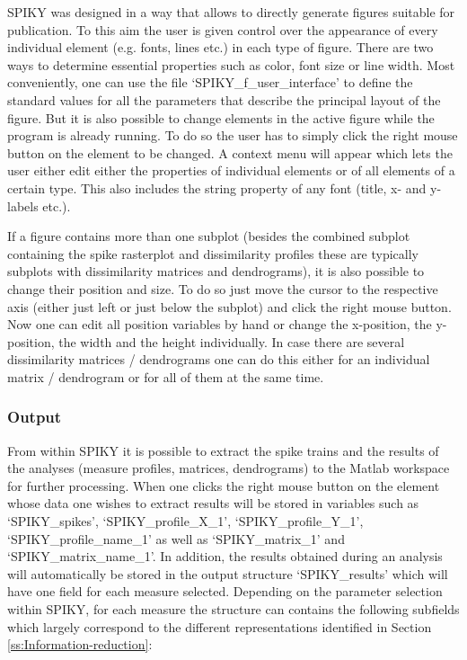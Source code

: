 \documentclass[10pt,twocolumn]{elsart5p}
\begin{document}
SPIKY was designed in a way that allows to directly generate figures suitable for publication. To this aim the user is given control over the appearance of every individual element (e.g. fonts, lines etc.) in each type of figure. There are two ways to determine essential properties such as color, font size or line width. Most conveniently, one can use the file `SPIKY\_f\_user\_interface' to define the standard values for all the parameters that describe the principal layout of the figure. But it is also possible to change elements in the active figure while the program is already running. To do so the user has to simply click the right mouse button on the element to be changed. A context menu will appear which lets the user either edit either the properties of individual elements or of all elements of a certain type. This also includes the string property of any font (title, x- and y-labels etc.).

If a figure contains more than one subplot (besides the combined subplot containing the spike rasterplot and dissimilarity profiles these are typically subplots with dissimilarity matrices and dendrograms), it is also possible to change their position and size. To do so just move the cursor to the respective axis (either just left or just below the subplot) and click the right mouse button. Now one can edit all position variables by hand or change the x-position, the y-position, the width and the height individually. In case there are several dissimilarity matrices / dendrograms one can do this either for an individual matrix / dendrogram or for all of them at the same time.


\subsubsection{\label{sss:Output} Output}

From within SPIKY it is possible to extract the spike trains and the results of the analyses (measure profiles, matrices, dendrograms) to the Matlab workspace for further processing. When one clicks the right mouse button on the element whose data one wishes to extract results will be stored in variables such as `SPIKY\_spikes', `SPIKY\_profile\_X\_1', `SPIKY\_profile\_Y\_1', `SPIKY\_profile\_name\_1' as well as `SPIKY\_matrix\_1' and `SPIKY\_matrix\_name\_1'. In addition, the results obtained during an analysis will automatically be stored in the output structure `SPIKY\_results' which will have one field for each measure selected. Depending on the parameter selection within SPIKY, for each measure the structure can contains the following subfields which largely correspond to the different representations identified in Section \ref{ss:Information-reduction}:
\end{document}
